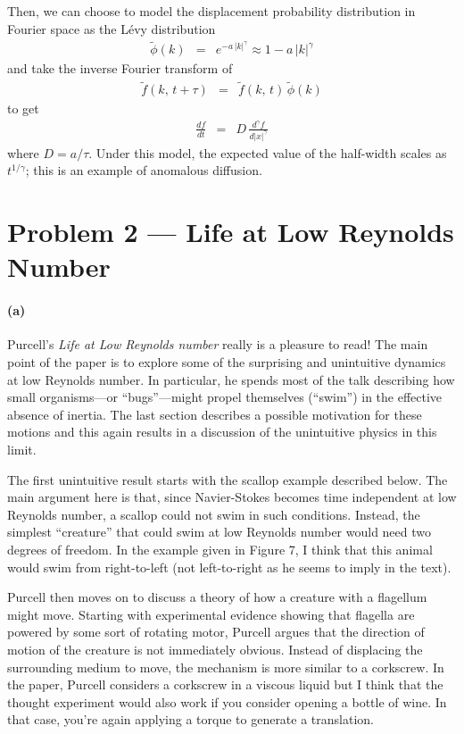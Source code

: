 \documentclass[12pt]{article}
\begin{document}
Then, we can choose to model the displacement probability distribution in
Fourier space as the L\'evy distribution
\begin{eqnarray}
\tilde{\phi}(k) &=& e^{-a\,|k|^\gamma} \approx 1 - a\,|k|^\gamma
\end{eqnarray}
and take the inverse Fourier transform of
\begin{eqnarray}
\tilde{f}(k,\,t+\tau) &=& \tilde{f}(k,\,t)\,\tilde{\phi}(k)
\end{eqnarray}
to get
\begin{eqnarray}
\frac{df}{dt} &=& D \, \frac{d^{\gamma}f}{d|x|^\gamma}
\end{eqnarray}
where $D = a/\tau$.
Under this model, the expected value of the half-width scales as
$t^{1/\gamma}$; this is an example of anomalous diffusion.


\section{Problem 2 --- Life at Low Reynolds Number}

\paragraph{(a)}

Purcell's \emph{Life at Low Reynolds number} \cite{purcell} really is a
pleasure to read!
The main point of the paper is to explore some of the surprising and
unintuitive dynamics at low Reynolds number.
In particular, he spends most of the talk describing how small organisms---or
``bugs''---might propel themselves (``swim'') in the effective absence of
inertia.
The last section describes a possible motivation for these motions and this
again results in a discussion of the unintuitive physics in this limit.

The first unintuitive result starts with the scallop example described below.
The main argument here is that, since Navier-Stokes becomes time independent
at low Reynolds number, a scallop could not swim in such conditions.
Instead, the simplest ``creature'' that could swim at low Reynolds number
would need two degrees of freedom.
In the example given in Figure 7, I think that this animal would swim from
right-to-left (not left-to-right as he seems to imply in the text).

Purcell then moves on to discuss a theory of how a creature with a flagellum
might move.
Starting with experimental evidence showing that flagella are powered by some
sort of rotating motor, Purcell argues that the direction of motion of the
creature is not immediately obvious.
Instead of displacing the surrounding medium to move, the mechanism is more
similar to a corkscrew.
In the paper, Purcell considers a corkscrew in a viscous liquid but I think
that the thought experiment would also work if you consider opening a bottle
of wine.
In that case, you're again applying a torque to generate a translation.
\end{document}

